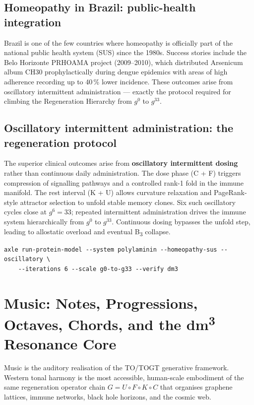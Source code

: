 \section{Homeopathy in Brazil: public-health integration}

Brazil is one of the few countries where homeopathy is officially part of the national public health system (SUS) since the 1980s. Success stories include the Belo Horizonte PRHOAMA project (2009--2010), which distributed Arsenicum album CH30 prophylactically during dengue epidemics with areas of high adherence recording up to 40\,\% lower incidence. These outcomes arise from oscillatory intermittent administration --- exactly the protocol required for climbing the Regeneration Hierarchy from \(g^0\) to \(g^{33}\).

\section{Oscillatory intermittent administration: the regeneration protocol}

The superior clinical outcomes arise from \textbf{oscillatory intermittent dosing} rather than continuous daily administration. The dose phase (C + F) triggers compression of signalling pathways and a controlled rank-1 fold in the immune manifold. The rest interval (K + U) allows curvature relaxation and PageRank-style attractor selection to unfold stable memory clones. Six such oscillatory cycles close at \(g^6 = 33\); repeated intermittent administration drives the immune system hierarchically from \(g^0\) to \(g^{33}\). Continuous dosing bypasses the unfold step, leading to allostatic overload and eventual B\textsubscript{3} collapse.

\begin{verbatim}
axle run-protein-model --system polylaminin --homeopathy-sus --oscillatory \
    --iterations 6 --scale g0-to-g33 --verify dm3
\end{verbatim}

\chapter{Music: Notes, Progressions, Octaves, Chords, and the dm\textsuperscript{3} Resonance Core}

Music is the auditory realisation of the TO/TOGT generative framework. Western tonal harmony is the most accessible, human-scale embodiment of the same regeneration operator chain $G = U \circ F \circ K \circ C$ that organises graphene lattices, immune networks, black hole horizons, and the cosmic web.

